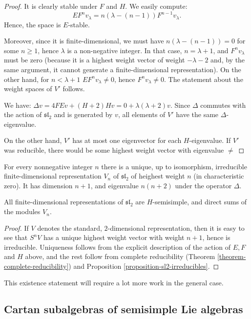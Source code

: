 \begin{proof}
 It is clearly stable under $F$ and $H$. We easily compute:
$$ EF^nv_\lambda = n(\lambda-(n-1))F^{n-1}v_\lambda.$$
Hence, the space is $E$-stable. 

Moreover, since it is finite-dimensional, we must have $n(\lambda-(n-1))=0$ for some $n\ge 1$, hence $\lambda$ is a non-negative integer. In that case, $n=\lambda+1$, and $F^n v_\lambda$ must be zero (because it is a highest weight vector of weight $-\lambda-2$ and, by the same argument, it cannot generate a finite-dimensional representation). On the other hand, for $n<\lambda+1$ $EF^nv_\lambda\ne 0$, hence $F^nv_\lambda\ne 0$. The statement about the weight spaces of $V'$ follows.

We have: $\Delta v = 4FEv+(H+2)Hv = 0+ \lambda(\lambda+2)v$. Since $\Delta$ commutes with the action of $\mathfrak{sl}_2$ and is generated by $v$, all elements of $V'$ have the same $\Delta$-eigenvalue.

On the other hand, $V'$ has at most one eigenvector for each $H$-eigenvalue. If $V'$ was reducible, there would be some highest weight vector with eigenvalue $\ne $
\end{proof}




\begin{theorem}
\label{theorem-reps-sl2}
For every nonnegative integer $n$ there is a unique, up to isomorphism, irreducible finite-dimensional representation $V_n$ of $\mathfrak{sl}_2$ of heighest weight $n$ (in characteristic zero). It has dimension $n+1$, and eigenvalue $n(n+2)$ under the operator $\Delta$.

All finite-dimensional representations of $\mathfrak{sl}_2$ are $H$-semisimple, and direct sums of the modules $V_n$.
\end{theorem}


\begin{proof}
If $V$ denotes the standard, $2$-dimensional representation, then it is easy to see that $S^n V$ has a unique highest weight vector with weight $n+1$, hence is irreducible. Uniqueness follows from the explicit description of the action of $E, F$ and $H$ above, and the rest follow from complete reducibility (Theorem \ref{theorem-complete-reducibility}) and Proposition \ref{proposition-sl2-irreducibles}.
\end{proof}

This existence statement will require a lot more work in the general case.

\subsection{Cartan subalgebras of semisimple Lie algebras}
\label{subsection-CSA-semisimple}


